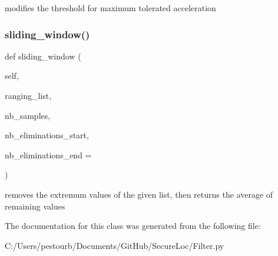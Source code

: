 \begin{DoxyVerb}modifies the threshold for maximum tolerated acceleration\end{DoxyVerb}
 \mbox{\label{class_filter_1_1_filter_a556284b0965efd1d347565d76c51a4ee}} 
\subsubsection{\texorpdfstring{sliding\+\_\+window()}{sliding\_window()}}
{\footnotesize\ttfamily def sliding\+\_\+window (\begin{DoxyParamCaption}\item[{}]{self,  }\item[{}]{ranging\+\_\+list,  }\item[{}]{nb\+\_\+samples,  }\item[{}]{nb\+\_\+eliminations\+\_\+start,  }\item[{}]{nb\+\_\+eliminations\+\_\+end = {} }\end{DoxyParamCaption})}

\begin{DoxyVerb}removes the extremum values of the given list,
then returns the average of remaining values\end{DoxyVerb}
 

The documentation for this class was generated from the following file\+:\begin{DoxyCompactItemize}
\item 
C\+:/\+Users/pestourb/\+Documents/\+Git\+Hub/\+Secure\+Loc/Filter.\+py\end{DoxyCompactItemize}
